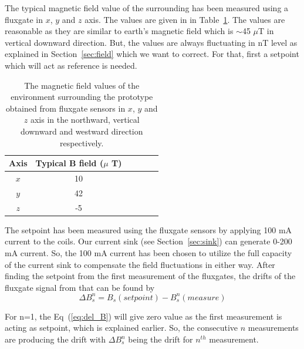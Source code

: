 The typical magnetic field value of the surrounding has been measured using a fluxgate in $x$, $y$ and $z$ axis. The values are given in in Table~\ref{table:Benvironment}. The values are reasonable as they are similar to earth's magnetic field which is $\sim$45 $\mu$T in vertical downward direction. But, the values are always fluctuating in nT level as explained in Section~\ref{sec:field} which we want to correct. For that, first a setpoint which will act as reference is needed.

\begin{table} [htb!]
    \centering
    \begin{tabular} { |c|c|c|c|c|c|} 
        \hline
        Axis & \makecell{Typical B field \\($\mu$ T)}\\
        \hline\hline
        $x$ & 10 \\ 
        \hline
        $y$ & 42 \\ 
        \hline
        $z$ & -5 \\ 
        \hline
    \end{tabular}
    \caption{The magnetic field values of the environment surrounding the prototype obtained from fluxgate sensors in $x$, $y$ and $z$ axis in the northward, vertical downward and westward direction respectively. }\label{table:Benvironment}
\end{table}

\FloatBarrier
The setpoint has been measured using the fluxgate sensors by applying 100 mA current to the coils. Our current sink (see Section~\ref{sec:sink}) can generate 0-200 mA current. So, the 100 mA current has been chosen to utilize the full capacity of the current sink to compensate the field fluctuations in either way. After finding the setpoint from the first measurement of the fluxgates, the drifts of the fluxgate signal from that can be found by
\begin{equation}\label{eq:del_B}
    \Delta B_s^n = B_s(setpoint) - B_s^n(measure)
\end{equation}

For n=1, the Eq~(\ref{eq:del_B}) will give zero value as the first measurement is acting as setpoint, which is explained earlier. So, the consecutive $n$ measurements are producing the drift with $\Delta B_s^n$ being the drift for $n^{th}$ measurement. 

